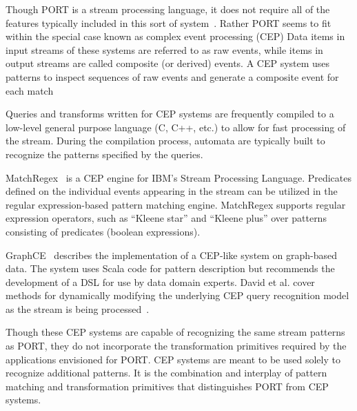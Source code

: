 Though PORT is a stream processing language, it does not
require all of the features typically
included in this sort of system~\cite{DBLP:journals/csur/DayarathnaP18}.
Rather PORT seems to fit within the special case
known as complex event processing (CEP) 
Data items in input streams of these systems are referred to as raw events, while items in output streams are called
composite (or derived) events. A CEP system uses patterns to inspect
sequences of raw events and generate a composite event for each
match~\cite{DBLP:journals/ibmrd/HirzelAGJKKMNSSW13}

Queries and transforms written for CEP systems are
frequently compiled to a low-level general purpose language (C, C++, etc.) to allow for fast
processing of the stream. During the compilation process, automata are typically
built to recognize the patterns specified by the queries.

MatchRegex~\cite{DBLP:conf/debs/Hirzel12} is a CEP engine for IBM’s Stream Processing
Language. Predicates defined on the individual events appearing in the
stream can be utilized in the regular expression-based pattern matching
engine. MatchRegex supports regular expression operators, such as “Kleene star”
and “Kleene plus” over patterns consisting of predicates (boolean expressions).

GraphCE~\cite{DBLP:conf/models/BarqueroBTV18} describes the implementation of a CEP-like system on graph-based data. The system uses Scala code for pattern description but recommends the development of a DSL for use by data domain experts.
David et al. cover methods for dynamically modifying the underlying CEP query recognition model as the stream is being processed~\cite{DBLP:journals/sosym/DavidRV18}.

Though these CEP systems are capable
of recognizing the same stream patterns as PORT, they
do not incorporate the
transformation primitives 
required by the applications
envisioned for PORT. CEP systems are meant
to be used solely to recognize additional patterns.
It is the combination and interplay of pattern matching and transformation
primitives that distinguishes PORT from CEP systems.

\vspace{-.5cm}

